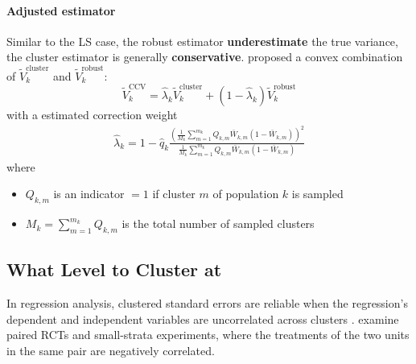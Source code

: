 \documentclass[twoside]{article}
\begin{document}
\paragraph*{Adjusted estimator}
Similar to the LS case, the robust estimator \textbf{underestimate} the true variance, the cluster estimator is generally \textbf{conservative}. \citet{abadie2023should} proposed a convex combination of $\tilde{V}_k^{\text{cluster}}$ and $\tilde{V}_k^{\text{robust}}$:
\begin{equation*}
    \tilde{V}^{\text{CCV}}_k = \hat{\lambda}_k \tilde{V}_k^{\text{cluster}} + \left(1-\hat{\lambda}_k\right)\tilde{V}_k^{\text{robust}}
\end{equation*}
with a estimated correction weight
\begin{align*}
    \hat{\lambda}_k = 1-\hat{q}_k \frac{\left(\frac{1}{M_k}\sum^{m_k}_{m=1}Q_{k,m}\bar{W}_{k,m}\left(1-\bar{W}_{k,m}\right)\right)^2}{\frac{1}{M_k}\sum^{m_k}_{m=1}Q_{k,m}\bar{W}_{k,m}\left(1-\bar{W}_{k,m}\right)}
\end{align*}
where 
\begin{itemize}
    \item $Q_{k,m}$ is an indicator $=1$ if cluster $m$ of population $k$ is sampled 
    \item $M_k=\sum^{m_k}_{m=1}Q_{k,m}$ is the total number of sampled clusters
\end{itemize}

\subsection{What Level to Cluster at}
In regression analysis, clustered standard errors are reliable when the regression's dependent and independent variables are uncorrelated across clusters \citep{cameron2015practitioner}.
\citet{de2024level} examine paired RCTs and small-strata experiments, where the treatments of the two units in the same pair are negatively correlated.
\end{document}
